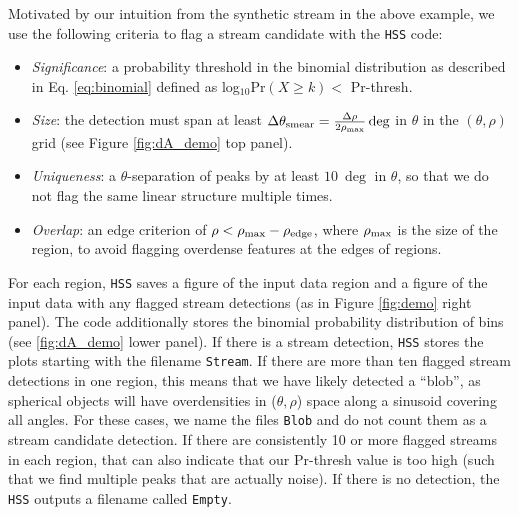 \documentclass[twocolumn]{aastex631}
\begin{document}
Motivated by our intuition from the synthetic stream in the above example, we use the following criteria to flag a stream candidate with the \texttt{HSS} code:
\begin{itemize}
    \item {\it Significance}: a probability threshold in the binomial distribution as described in Eq. \ref{eq:binomial} defined as log$_{10}$Pr$( X \geq k) <$ Pr-thresh.
    
    \item {\it Size}: the detection must span at least  $\Delta \theta_{\rm smear}=\frac{\Delta \rho}{2 \rho_{\rm max}} \deg$ in $\theta$ in the $(\theta,\rho)$ grid (see Figure \ref{fig:dA_demo} top panel).
    
    \item {\it Uniqueness}: a $\theta$-separation of peaks by at least $10~ \deg$ in $\theta$, so that we do not flag the same linear structure multiple times.
    
    \item {\it Overlap}: an edge criterion of $\rho < \rho_{\rm max} - \rho_{\rm edge}$, where $\rho_{\rm max}$ is the size of the region, to avoid flagging overdense features at the edges of regions. 
\end{itemize}

For each region, \texttt{HSS} saves a figure of the input data region and a figure of the input data with any flagged stream detections (as in Figure \ref{fig:demo} right panel). The code additionally stores the binomial probability distribution of bins (see \ref{fig:dA_demo} lower panel).
If there is a stream detection, \texttt{HSS} stores the plots starting with the filename \texttt{Stream}. If there are more than ten flagged stream detections in one region, this means that we have likely detected a ``blob'', as spherical objects will have overdensities in ($\theta,\rho$) space along a sinusoid covering all angles. For these cases, we name the files \texttt{Blob} and do not count them as a stream candidate detection. If there are consistently 10 or more flagged streams in each region, that can also indicate that our Pr-thresh value is too high (such that we find multiple peaks that are actually noise). If there is no detection, the \texttt{HSS} outputs a filename called  \texttt{Empty}. 
\end{document}
